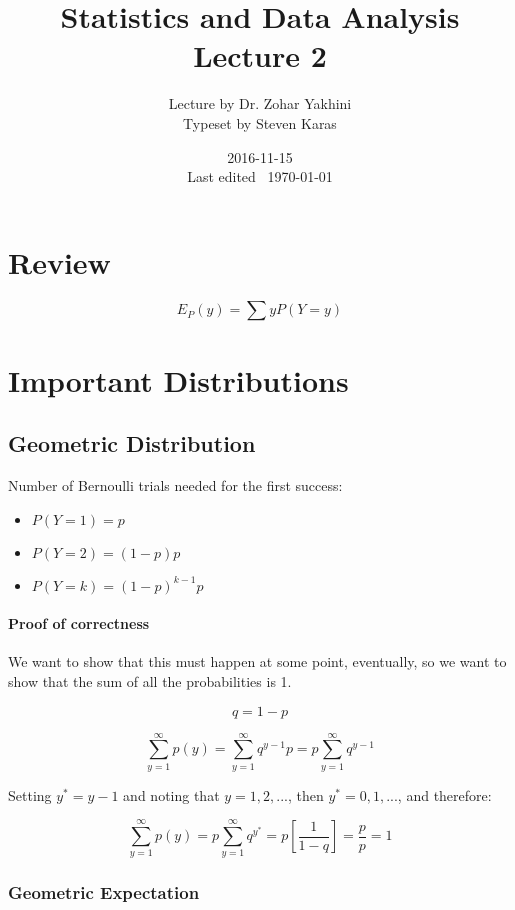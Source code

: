 \documentclass[a4paper]{article}
\title{Statistics and Data Analysis\\\large Lecture 2}
\date{2016-11-15 \\ Last edited \currenttime\ \today}
\author{Lecture by Dr. Zohar Yakhini\\Typeset by Steven Karas}
\begin{document}
\maketitle

\section{Review}

\paragraph{}
\[
E_P(y)=\sum yP(Y=y)
\]

\section{Important Distributions}

\subsection{Geometric Distribution}

Number of Bernoulli trials needed for the first success:

\begin{itemize}
  \item $P(Y=1)=p$
  \item $P(Y=2)=(1-p)p$
  \item $P(Y=k)=(1-p)^{k-1}p$
\end{itemize}

\paragraph{Proof of correctness}
We want to show that this must happen at some point, eventually, so we want to show that the sum of all the probabilities is 1.

\[ q=1-p \]

\[
\sum_{y=1}^\infty p(y)
=\sum_{y=1}^\infty q^{y-1}p
=p\sum_{y=1}^\infty q^{y-1}
\]

Setting $y^*=y-1$ and noting that $y=1,2,...$, then $y^*=0,1,...$, and therefore:

\[
\sum_{y=1}^\infty p(y)
=p\sum_{y=1}^\infty q^{y^*}
=p[\frac{1}{1-q}]=\frac{p}{p}=1
\]

\subsubsection{Geometric Expectation}
\end{document}
